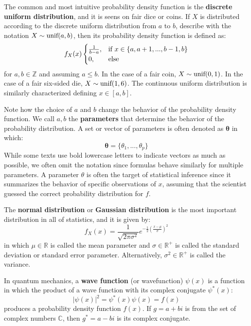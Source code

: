 \documentclass[10pt, a5paper, twoside, openright]{memoir}
\begin{document}
The common and most intuitive probability density function is the \textbf{discrete uniform distribution}, and it is seens on fair dice or coins. If $X$ is distributed according to the discrete uniform distribution from $a$ to $b$, describe with the notation $X \sim \textnormal{unif}(a,b)$, then its probability density function is defined as:
\[
f_X(x)
\begin{cases}
\frac{1}{b-a}, & \textnormal{if} \ x \in \{ a, a+1 ,...,b-1, b\} \\
0, & \textnormal{else}
\end{cases}
\]
for $a, b \in \mathbb Z$ and assuming $a \leq b$. In the case of a fair coin, $X \sim \textnormal{unif}(0,1)$. In the case of a fair six-sided die, $X \sim \textnormal{unif}(1,6)$. The continuous uniform distribution is similarly characterized defining $x \in [a, b]$.

Note how the choice of $a$ and $b$ change the behavior of the probability density function. We call $a,b$ the \textbf{parameters} that determine the behavior of the probability distribution. A set or vector of parameters is often denoted as $ \boldsymbol{\theta} $ in which:
$$ \boldsymbol \theta = \{\theta_1 ,..., \theta_p\} $$
While some texts use bold lowercase letters to indicate vectors as much as possible, we often omit the notation since formulas behave similarly for multiple parameters. A parameter $\theta$ is often the target of statistical inference since it summarizes the behavior of specific observations of $x$, assuming that the scientist guessed the correct probability distribution for $f$.

The \textbf{normal distribution} or \textbf{Gaussian distribution} is the most important distribution in all of statistics, and it is given by:
$$f_X(x) = \frac{1}{\sqrt{2 \pi \sigma^2}}e^{-\frac{1}{2}(\frac{x - \mu}{\sigma})^2}$$
in which $\mu \in \mathbb R$ is called the mean parameter and $\sigma \in \mathbb R^+$ is called the standard deviation or standard error parameter. Alternatively, $\sigma^2 \in \mathbb R^+$ is called the variance.

In quantum mechanics, a \textbf{wave function} (or wavefunction)  $\psi(x)$ is a function in which the product of a wave function with its complex conjugate $\psi^* (x)$:
$$|\psi(x)|^2 = \psi^* (x) \psi (x) = f(x)$$
produces a probability density function $f(x)$. If $g = a+bi$ is from the set of complex numbers $\mathbb C$, then $g^* = a - bi$ is its complex conjugate.
\end{document}
